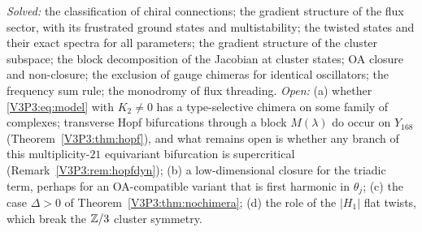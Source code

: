 \begin{remark}\label{V3P3:rem:scope}
\emph{Solved:} the classification of chiral connections; the gradient structure of the flux
sector, with its frustrated ground states and multistability; the twisted states and their
exact spectra for all parameters; the gradient structure of the cluster subspace; the block
decomposition of the Jacobian at cluster states; OA closure and non-closure; the exclusion of
gauge chimeras for identical oscillators; the frequency sum rule; the monodromy of flux
threading. \emph{Open:}
(a) whether \eqref{V3P3:eq:model} with $K_2\ne0$ has a type-selective chimera on some family
of complexes; transverse Hopf bifurcations through a block $M(\lambda)$ do occur on $Y_{168}$
(Theorem~\ref{V3P3:thm:hopf}), and what remains open is whether any branch of this
multiplicity-$21$ equivariant bifurcation is supercritical (Remark~\ref{V3P3:rem:hopfdyn});
(b) a low-dimensional closure for the triadic term, perhaps for an OA-compatible variant that
is first harmonic in $\theta_j$;
(c) the case $\Delta>0$ of Theorem~\ref{V3P3:thm:nochimera};
(d) the role of the $|H_1|$ flat twists, which break the $\mathbb{Z}/3$ cluster symmetry.
\end{remark}

